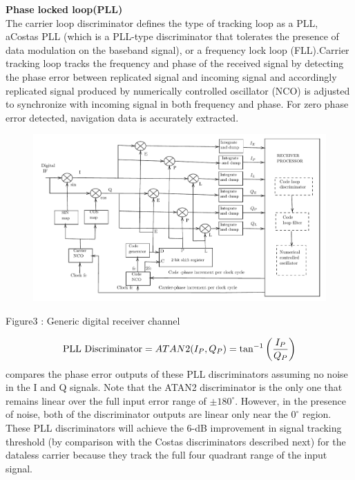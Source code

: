 \textbf{Phase locked loop(PLL)}\\
The carrier loop discriminator defines the type of tracking loop as a PLL, aCostas PLL (which is a PLL-type discriminator that tolerates the presence of data modulation on the baseband signal), or a frequency lock loop (FLL).Carrier tracking loop tracks the frequency and phase of the received signal by detecting the phase error between replicated signal and incoming signal and accordingly replicated signal produced by numerically controlled oscillator (NCO) is adjusted to synchronize with incoming signal in both frequency and phase. For zero phase error detected, navigation data is accurately extracted. 
\begin{figure}[!h]%
\includegraphics[scale=0.5]{figs/block3}
\end{figure}
\begin{center}
Figure3 : Generic digital receiver channel
\end{center}
\begin{align}
\text{PLL Discriminator} =ATAN2(I_P,Q_P) = \tan^{-1}\left(\frac{I_P}{Q_P}\right)
\end{align}
compares the phase error outputs of these PLL discriminators assuming no noise in the I and Q signals. Note that the ATAN2 discriminator is the only one that remains linear over the full input error range of $\pm180^{\circ}$. However, in the presence of noise, both of the discriminator outputs are linear only near the $0^{\circ}$ region. These PLL discriminators will achieve the 6-dB improvement in signal tracking threshold (by comparison with the Costas discriminators described next) for the dataless carrier because they track the full four quadrant range of the input signal.\\
